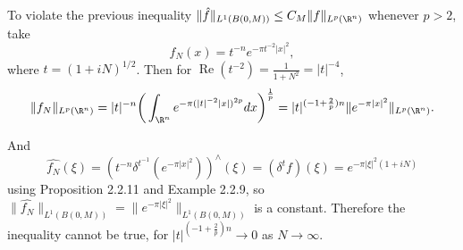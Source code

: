 \begin{itemize}
To violate the previous inequality 
$\|\hat{f}\|_{L^1(B(0,M))}\leq C_M\|f\|_{L^p(\R^n)}$ 
whenever $p>2$, take $$f_N(x)=t^{-n}e^{-\pi t^{-2}|x|^2},$$
where $t=(1+iN)^{1/2}$. Then for $\operatorname{Re}(t^{-2})=\frac{1}{1+N^2}=|t|^{-4}$,
$$\|f_N\|_{L^p(\R^n)}=|t|^{-n}\bigg(\int_{\R^n}e^{-\pi(|t|^{-2}|x|)^{2p}}dx\bigg)^\frac{1}{p}
=|t|^{(-1+\frac{2}{p})n}\|e^{-\pi|x|^2}\|_{L^p(\R^n)}.$$

And $$\widehat{f_N}(\xi)=(t^{-n}\delta^{t^{-1}}(e^{-\pi|x|^2}))^\wedge(\xi)
=(\delta^t f)(\xi)=e^{-\pi|\xi|^2(1+iN)}$$
using Proposition 2.2.11 and Example 2.2.9, 
so $\|\widehat{f_N}\|_{L^1(B(0,M))}=\|e^{-\pi|\xi|^2}\|_{L^1(B(0,M))}$ 
is a constant. Therefore the inequality cannot be true, 
for $|t|^{(-1+\frac{2}{p})n}\rightarrow0$ as $N\rightarrow\infty$.
\end{itemize}